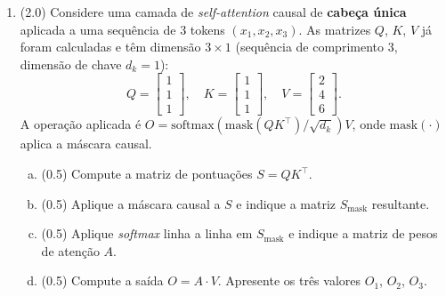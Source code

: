 \documentclass[11pt,a4paper]{article}
\begin{document}
\begin{enumerate}[1)]
\begin{enumerate}[a)]
    \item ( )\,V \quad ( )\,F \quad \textit{Multi-Query Attention} (MQA) usa $H$ cabeças independentes para Q, K e V; portanto, reduzir o número de cabeças \emph{de Q} é a forma de diminuir o tamanho do \textit{KV-cache} durante a inferência.\\[0.2em]
    \rule{\linewidth}{0.4pt}\\[0.2em]
    \rule{\linewidth}{0.4pt}
\end{enumerate}

\item (2.0) Considere uma camada de \textit{self-attention} causal de \textbf{cabeça única} aplicada a uma sequência de 3 tokens $(x_1, x_2, x_3)$. As matrizes $Q$, $K$, $V$ já foram calculadas e têm dimensão $3 \times 1$ (sequência de comprimento 3, dimensão de chave $d_k = 1$):
\[
    Q = \begin{bmatrix} 1 \\ 1 \\ 1 \end{bmatrix},\quad
    K = \begin{bmatrix} 1 \\ 1 \\ 1 \end{bmatrix},\quad
    V = \begin{bmatrix} 2 \\ 4 \\ 6 \end{bmatrix}.
\]
A operação aplicada é $O = \mathrm{softmax}\!\left(\mathrm{mask}(QK^\top)/\sqrt{d_k}\right) V$, onde $\mathrm{mask}(\cdot)$ aplica a máscara causal.

\begin{enumerate}[a)]
    \item (0.5) Compute a matriz de pontuações $S = QK^\top$.
    \vspace{1.5cm}

    \item (0.5) Aplique a máscara causal a $S$ e indique a matriz $S_\text{mask}$ resultante.
    \vspace{1.5cm}

    \item (0.5) Aplique \textit{softmax} linha a linha em $S_\text{mask}$ e indique a matriz de pesos de atenção $A$.
    \vspace{2.5cm}

    \item (0.5) Compute a saída $O = A \cdot V$. Apresente os três valores $O_1$, $O_2$, $O_3$.
    \vspace{2cm}
\end{enumerate}

\end{enumerate}
\end{document}
